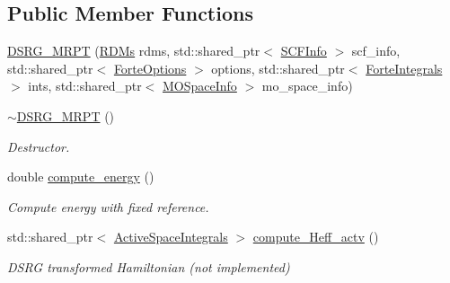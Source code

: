 \subsection*{Public Member Functions}
\begin{DoxyCompactItemize}
\item 
\mbox{\hyperlink{classforte_1_1_d_s_r_g___m_r_p_t_a675c39945f959015eb41954094f4bdd4}{D\+S\+R\+G\+\_\+\+M\+R\+PT}} (\mbox{\hyperlink{classforte_1_1_r_d_ms}{R\+D\+Ms}} rdms, std\+::shared\+\_\+ptr$<$ \mbox{\hyperlink{classforte_1_1_s_c_f_info}{S\+C\+F\+Info}} $>$ scf\+\_\+info, std\+::shared\+\_\+ptr$<$ \mbox{\hyperlink{classforte_1_1_forte_options}{Forte\+Options}} $>$ options, std\+::shared\+\_\+ptr$<$ \mbox{\hyperlink{classforte_1_1_forte_integrals}{Forte\+Integrals}} $>$ ints, std\+::shared\+\_\+ptr$<$ \mbox{\hyperlink{classforte_1_1_m_o_space_info}{M\+O\+Space\+Info}} $>$ mo\+\_\+space\+\_\+info)
\item 
\mbox{\hyperlink{classforte_1_1_d_s_r_g___m_r_p_t_a4707cbb0942d995c4c904c94d3168ddd}{$\sim$\+D\+S\+R\+G\+\_\+\+M\+R\+PT}} ()
\begin{DoxyCompactList}\small\item\em Destructor. \end{DoxyCompactList}\item 
double \mbox{\hyperlink{classforte_1_1_d_s_r_g___m_r_p_t_a83b7f20d255a4f1f33bb05d707846f85}{compute\+\_\+energy}} ()
\begin{DoxyCompactList}\small\item\em Compute energy with fixed reference. \end{DoxyCompactList}\item 
std\+::shared\+\_\+ptr$<$ \mbox{\hyperlink{classforte_1_1_active_space_integrals}{Active\+Space\+Integrals}} $>$ \mbox{\hyperlink{classforte_1_1_d_s_r_g___m_r_p_t_a929556373e50b9baeefbdd461fd72124}{compute\+\_\+\+Heff\+\_\+actv}} ()
\begin{DoxyCompactList}\small\item\em D\+S\+RG transformed Hamiltonian (not implemented) \end{DoxyCompactList}\end{DoxyCompactItemize}
